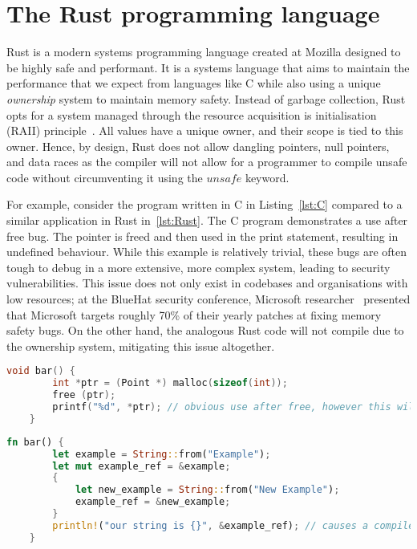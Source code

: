 \section{The Rust programming language}

Rust is a modern systems programming language created at Mozilla designed to be highly safe and performant.
It is a systems language that aims to maintain the performance that we expect from languages like C while also using a unique \textit{ownership} system to maintain memory safety.
Instead of garbage collection, Rust opts for a system managed through the resource acquisition is initialisation (RAII) principle~\citep{rust_raii_2021}.
All values have a unique owner, and their scope is tied to this owner.
Hence, by design, Rust does not allow dangling pointers, null pointers, and data races as the compiler will not allow for a programmer to compile unsafe code without circumventing it using the $unsafe$ keyword.

For example, consider the program written in C in Listing~\ref{lst:C} compared to a similar application in Rust in~\ref{lst:Rust}.
The C program demonstrates a use after free bug.
The pointer is freed and then used in the print statement, resulting in undefined behaviour.
While this example is relatively trivial, these bugs are often tough to debug in a more extensive, more complex system, leading to security vulnerabilities.
This issue does not only exist in codebases and organisations with low resources; at the BlueHat security conference, Microsoft researcher~\cite{miller_msrc-security-research2019_02_2019} presented that Microsoft targets roughly 70\% of their yearly patches at fixing memory safety bugs.
On the other hand, the analogous Rust code will not compile due to the ownership system, mitigating this issue altogether.

\begin{lstlisting}[language=C, float, caption={An example of a use after free in C code. This is an incorrect use of dynamic memory management, however it compiles. In large, complex code bases, missing bugs such as these often happens and can cause exploitable security issues.}, label=lst:C]
    void bar() {
        int *ptr = (Point *) malloc(sizeof(int));
        free (ptr);
        printf("%d", *ptr); // obvious use after free, however this will compile
    }
\end{lstlisting}

\begin{lstlisting}[language=Rust, float, caption={A similar application in Rust will not compile due to the safety guaranteed by the ownership system. A borrow occurs when $example\_ref$ is assigned to point to $new\_example$, however the ownership system recognises that the borrowed value does not live long enough.}, label=lst:Rust]
    fn bar() {
        let example = String::from("Example");
        let mut example_ref = &example;
        {
            let new_example = String::from("New Example");
            example_ref = &new_example;
        }
        println!("our string is {}", &example_ref); // causes a compiler error in Rust: error `new_example` does not live long enough
    }
\end{lstlisting}

